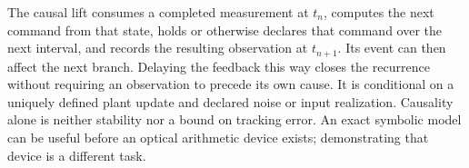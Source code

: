 The causal lift consumes a completed measurement at $t_n$, computes the next
command from that state, holds or otherwise declares that command over the
next interval, and records the resulting observation at $t_{n+1}$. Its event
can then affect the next branch. Delaying the feedback this way closes the
recurrence without requiring an observation to precede its own cause.
It is conditional on a uniquely defined plant update and declared noise or
input realization. Causality alone is neither stability nor a bound on
tracking error. An exact symbolic model can be useful before an optical
arithmetic device exists; demonstrating that device is a different task.
